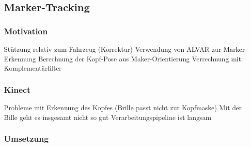\subsection{Marker-Tracking}
\subsubsection{Motivation}
Stützung relativ zum Fahrzeug (Korrektur) Verwendung von ALVAR zur Marker-Erkennung Berechnung der Kopf-Pose aus Maker-Orientierung Verrechnung mit Komplementärfilter
\subsubsection{Kinect}
Probleme mit Erkennung des Kopfes (Brille passt nicht zur Kopfmaske) Mit der Bille geht es insgesamt nicht so gut Verarbeitungspipeline ist langsam
\subsubsection{Umsetzung}